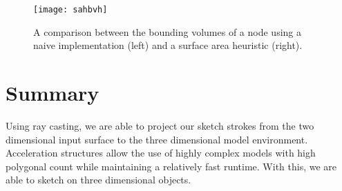 \begin{figure}
\texttt{[image: sahbvh]}
\caption{A comparison between the bounding volumes of a node using a naive implementation (left) and a surface area heuristic (right).}
\end{figure}

\section{Summary}

Using ray casting, we are able to project our sketch strokes from the two dimensional input surface to the three dimensional model environment.
Acceleration structures allow the use of highly complex models with high polygonal count while maintaining a relatively fast runtime.
With this, we are able to sketch on three dimensional objects. 